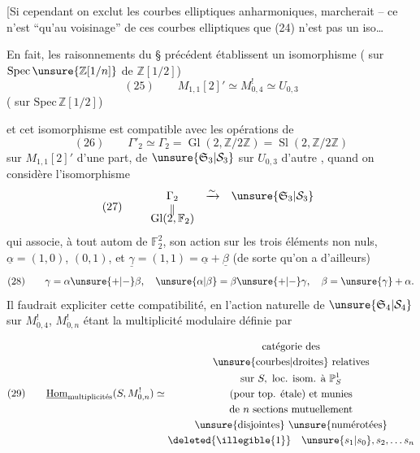 [Si cependant on exclut les courbes elliptiques anharmoniques,  marcherait -- ce n'est ``qu'au voisinage'' de ces courbes elliptiques que (24) n'est pas un iso\ldots
{}

En fait, les raisonnements du \S{} précédent établissent un isomorphisme ( sur  $\mathrm{Spec}\,\unsure{\mathbb Z[1/n]}$ de $\mathbb Z[1/2]$)
\[
(25)\qquad M_{1,1}[2]'\simeq M_{0,4}^{!}\simeq U_{0,3}
\]
( sur $\mathrm{Spec}\,\mathbb Z[1/2]$)


et cet isomorphisme est compatible avec les opérations de 
\[
(26)\qquad \Gamma'_2\simeq\Gamma_2=\operatorname{Gl}(2,\mathbb Z/2\mathbb Z)=\operatorname{Sl}(2,\mathbb Z/2\mathbb Z)
\]
sur $M_{1,1}[2]'$ d'une part, de $\unsure{\mathfrak S_3|\mathcal S_3}$ sur $U_{0,3}$ d'autre , quand on considère l'isomorphisme
\[
(27)\qquad
\begin{array}{ccc}
\Gamma_2 & \xrightarrow{\sim} & \unsure{\mathfrak S_3|\mathcal S_3}\\
\Vert &&\\[-4pt]
\operatorname{Gl}(2,\mathbb F_2)&&
\end{array}
\]
qui associe, à tout autom de $\mathbb F_2^2$, son action sur les trois éléments non nuls, $\underline{\alpha}=(1,0)$, \inserted{$\underline{\beta}=$}$(0,1)$, et $\underline{\gamma}=(1,1)=\underline{\alpha}+\underline{\beta}$ (de sorte qu'on a d'ailleurs) 
\[
(28)\qquad \gamma=\alpha\unsure{+|-}\beta,\quad \unsure{\alpha|\beta}=\beta\unsure{+|-}\gamma,\quad \beta=\unsure{\gamma}+\alpha.
\]
Il faudrait expliciter cette compatibilité, en  l'action naturelle de $\unsure{\mathfrak S_4|\mathcal S_4}$ sur $M_{0,4}^{!}$, $M_{0,n}^{!}$ étant la multiplicité modulaire définie par

\[
(29)\qquad
\underline{\operatorname{Hom}}_{\text{multiplicités}}(S,M_{0,n}^{!})\simeq
\begin{gathered}
\text{catégorie des}\\
\text{\unsure{courbes|droites} relatives}\\
\text{sur }S,\ \text{loc. isom. à }\mathbb P^1_S\\
\text{(pour top. étale) et munies}\\
\text{de }n\text{ sections mutuellement}\\
\text{\unsure{disjointes} \unsure{numérotées}}\\
\deleted{\illegible{1}}\quad\unsure{s_1|s_0},s_2,\ldots s_n
\end{gathered}
\]

